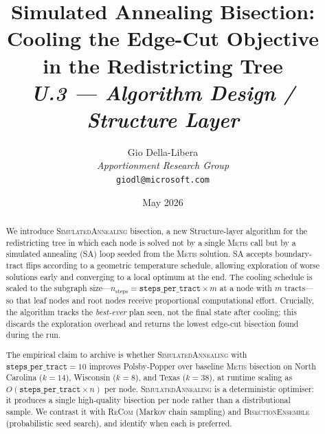 \documentclass[12pt]{article}
\title{%
  \textbf{Simulated Annealing Bisection: Cooling the Edge-Cut Objective}\\
  \textbf{in the Redistricting Tree}\\[0.8em]
  \normalsize\textit{U.3 --- Algorithm Design / Structure Layer}%
}
\author{%
  Gio Della-Libera\\
  \textit{Apportionment Research Group}\\
  \small\texttt{giodl@microsoft.com}
}
\date{May 2026}
\newcommand{\sa}{\textsc{SimulatedAnnealing}}
\newcommand{\metis}{\textsc{Metis}}
\newcommand{\be}{\textsc{BisectionEnsemble}}
\newcommand{\recom}{\textsc{ReCom}}
\begin{document}
\maketitle

\begin{abstract}
\noindent
We introduce \sa{} bisection, a new Structure-layer algorithm for the
redistricting tree in which each node is solved not by a single
\metis{} call but by a simulated annealing (SA) loop seeded from
the \metis{} solution.
SA accepts boundary-tract flips according to a geometric temperature
schedule, allowing exploration of worse solutions early and converging
to a local optimum at the end.
The cooling schedule is scaled to the subgraph size---$n_{\mathrm{steps}}
= \texttt{steps\_per\_tract} \times m$ at a node with $m$ tracts---so that
leaf nodes and root nodes receive proportional computational effort.
Crucially, the algorithm tracks the \emph{best-ever} plan seen, not
the final state after cooling; this discards the exploration overhead
and returns the lowest edge-cut bisection found during the run.

The empirical claim to archive is whether \sa{} with
$\texttt{steps\_per\_tract} = 10$ improves Polsby-Popper over baseline
\metis{} bisection on North Carolina ($k=14$), Wisconsin ($k=8$), and Texas
($k=38$), at runtime scaling as
$O(\texttt{steps\_per\_tract} \times n)$ per node.
\sa{} is a deterministic optimiser: it produces a single high-quality
bisection per node rather than a distributional sample.
We contrast it with \recom{} (Markov chain sampling) and \be{}
(probabilistic seed search), and identify when each is preferred.
\end{abstract}

\tableofcontents
\newpage












\end{document}
